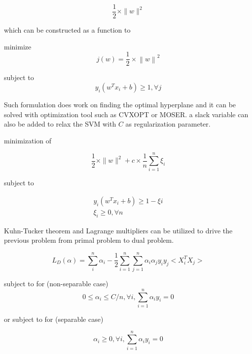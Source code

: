 \documentclass[10pt,twocolumn,letterpaper]{article}
\begin{document}
\begin{equation}
\frac{1}{2} \times\|w\|^{2}
\end{equation}


which can be constructed as a function to 

minimize 
\begin{equation}
j\left( w\right) =\dfrac{1}{2}\times \left\| w\right\| ^{2}
\end{equation}

subject to 
\begin{equation}
y_{i}\left( w^{T}x_{i}+b\right) \geq 1 , \forall j
\end{equation}

Such formulation does work on finding the optimal hyperplane and it can be solved with  optimization tool such as CVXOPT or MOSER. a slack variable can also be added to relax the SVM with $C$ as regularization parameter. 

minimization of 

\begin{equation}
\frac{1}{2} \times\|w\|^{2}+c\times \dfrac{1}{n}\sum ^{n}_{i=1}\xi _{i}
\end{equation}

subject to 

\begin{equation}
\begin{aligned}y_{i}\left( w^{T}x_{i}+b\right) \geq 1-\xi i\\
\xi _{i}\geq 0,\forall n\end{aligned}
\end{equation}


Kuhn-Tucker theorem and Lagrange multipliers can be utilized to drive the previous problem from primal problem to dual problem. 

\begin{equation}
L_{D}\left( \alpha \right) =\sum ^{n}_{i}\alpha _{i}-\dfrac{1}{2}\sum ^{n}_{i=1}\sum ^{n}_{j=1}\alpha _{i}\alpha _{j}y_{i}y_{j} <X_{i}^{T}X_{j} >
\label{eqn:l}
\end{equation}

subject to for (non-separable case)
\begin{equation}
0 \leq \alpha_{i} \leq C/n , \forall i,\sum ^{n}_{i=1}\alpha _{i}y_{i}=0
\end{equation}

or subject to for (separable case)

\begin{equation}
\alpha_{i} \geq 0 , \forall i,\sum ^{n}_{i=1}\alpha _{i}y_{i}=0
\end{equation}
\end{document}
